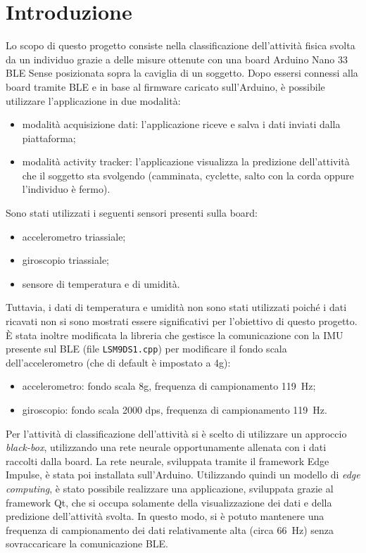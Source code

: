 \section{Introduzione}
Lo scopo di questo progetto consiste nella classificazione dell'attività fisica svolta da un individuo grazie a delle misure ottenute con una board Arduino Nano 33 BLE Sense posizionata sopra la caviglia di un soggetto. Dopo essersi connessi alla board tramite BLE e in base al firmware caricato sull'Arduino, è possibile utilizzare l'applicazione in due modalità:
\begin{itemize}
	\item modalità acquisizione dati: l'applicazione riceve e salva i dati inviati dalla piattaforma;
	\item modalità activity tracker: l'applicazione visualizza la predizione dell'attività che il soggetto sta svolgendo (camminata, cyclette, salto con la corda oppure l'individuo è fermo).
\end{itemize}
Sono stati utilizzati i seguenti sensori presenti sulla board:
\begin{itemize}
	\item accelerometro triassiale; 
	\item giroscopio triassiale;
	\item sensore di temperatura e di umidità.
\end{itemize}
Tuttavia, i dati di temperatura e umidità non sono stati utilizzati poiché i dati ricavati non si sono mostrati essere significativi per l'obiettivo di questo progetto. \`E stata inoltre modificata la libreria che gestisce la comunicazione con la IMU presente sul BLE (file \texttt{LSM9DS1.cpp}) per modificare il fondo scala dell'accelerometro (che di default è impostato a 4g):
\begin{itemize}
	\item accelerometro: fondo scala 8g, frequenza di campionamento \SI{119}{\hertz};
	\item giroscopio: fondo scala 2000 dps, frequenza di campionamento \SI{119}{\hertz}.
\end{itemize}

Per l'attività di classificazione dell'attività si è scelto di utilizzare un approccio \textit{black-box}, utilizzando una rete neurale opportunamente allenata con i dati raccolti dalla board. La rete neurale, sviluppata tramite il framework Edge Impulse, è stata poi installata sull'Arduino. Utilizzando quindi un modello di \textit{edge computing}, è stato possibile realizzare una applicazione, sviluppata grazie al framework Qt, che si occupa solamente della visualizzazione dei dati e della predizione dell'attività svolta. In questo modo, si è potuto mantenere una frequenza di campionamento dei dati relativamente alta (circa \SI{66}{\hertz}) senza sovraccaricare la comunicazione BLE.
